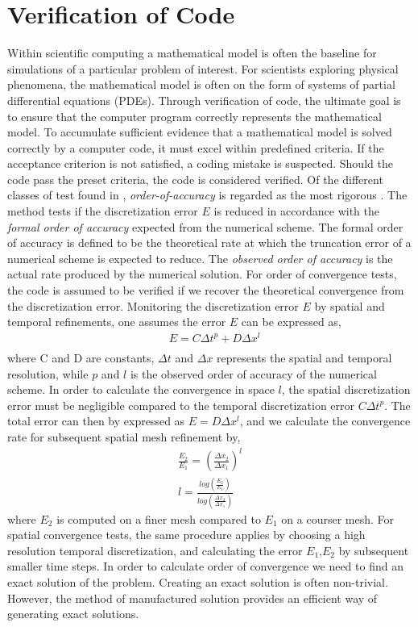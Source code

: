 \section{Verification of Code}
Within scientific computing a mathematical model is often the baseline for simulations of a particular problem of interest. For scientists exploring physical phenomena, the mathematical model is often on the form of systems of partial differential equations (PDEs). Through verification of code, the ultimate goal is to ensure that the computer program correctly represents the mathematical model. To accumulate sufficient evidence that a mathematical model is solved correctly by a computer code, it must excel within predefined criteria. If the acceptance criterion is not satisfied, a coding mistake is suspected. Should the code pass the preset criteria, the code is considered verified. Of the different classes of test found in \cite{Roache},  \textit{order-of-accuracy} is regarded as the most rigorous  \cite{Biggs, Roache, Etienne2006}. The method tests if the discretization error $E$ is reduced in accordance with the \textit{formal order of accuracy} expected from the numerical scheme. The formal order of accuracy is defined to be the theoretical rate at which the truncation error of a numerical scheme is expected to reduce. The \textit{observed order of accuracy} is the actual rate produced by the numerical solution.
For order of convergence tests, the code is assumed to be verified if we recover the theoretical convergence from the discretization error. Monitoring the discretization error $E$ by spatial and temporal refinements, one assumes the error $E$ can be expressed as,
\begin{align*}
&E = C\Delta t^p + D\Delta x^l\\
\end{align*} 
where C and D are constants, $\Delta t$ and $\Delta x$ represents the spatial and temporal resolution, while $p$ and $l$ is the observed order of accuracy of the numerical scheme. 
In order to calculate the convergence in space $l$, the spatial discretization error must be negligible compared to the temporal discretization error $C\Delta t^p$. The total error can then by expressed as $E =  D\Delta x^l$, and we calculate the convergence rate for subsequent spatial mesh refinement by,
\begin{align}
\frac{E_2}{E_1} = (\frac{\Delta x_2}{\Delta x_1})^l \\
l = \frac{log (\frac{E_2}{E_1})}{ log (\frac{\Delta x_2}{\Delta x_1}) }
\end{align}
where $E_2$ is computed on a finer mesh compared to $E_1$ on a courser mesh. For spatial convergence tests, the same procedure applies by choosing a high resolution temporal discretization, and calculating the error $E_1$,$E_2$ by subsequent smaller time steps. In order to calculate order of convergence we need to find an exact solution of the problem. Creating an exact solution is often non-trivial. However, the method of manufactured solution provides an efficient way of generating exact solutions.
